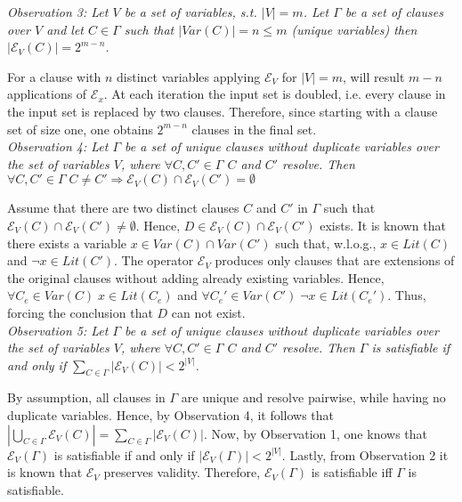 \documentclass[11pt,a4paper]{article}
\begin{document}
\begin{enumerate}
\begin{itemize}
\emph{Observation 3:  Let $V$ be a set of variables, s.t. $|V|=m$. Let $\Gamma$ be a set of clauses over $V$ and let $C \in \Gamma$ such that $|\mathit{Var}(C)|=n\leq m$ (unique variables) then $|\mathcal{E}_V(C)|=2^{m-n}$.}

For a clause with $n$ distinct variables applying $\mathcal{E}_V$ for $|V|=m$, will result $m-n$ applications of $\mathcal{E}_x$. At each iteration the input set is doubled, i.e. every clause in the input set is replaced by two clauses. Therefore, since starting with a clause set of size one, one obtains $2^{m-n}$ clauses in the final set.  \\



\emph{Observation 4: Let $\Gamma$ be a set of unique clauses without duplicate variables over the set of variables $V$, where $\forall C, C' \in \Gamma$ $C$ and $C'$ resolve. Then $\forall C, C' \in \Gamma \; C \neq C' \Rightarrow \mathcal{E}_V(C) \cap \mathcal{E}_V(C') = \emptyset$}


Assume that there are two distinct clauses $C$ and $C'$ in $\Gamma$ such that $ \mathcal{E}_V(C) \cap \mathcal{E}_V(C') \neq \emptyset$. Hence, $D \in  \mathcal{E}_V(C) \cap \mathcal{E}_V(C')$ exists. It is known that there exists a variable $x  \in \mathit{Var}(C) \cap  \mathit{Var}(C')$ such that, w.l.o.g., $x \in \mathit{Lit}(C)$ and $\neg x \in \mathit{Lit}(C')$. The operator $\mathcal{E}_V$ produces only clauses that are extensions of the original clauses without adding already existing variables. Hence, $\forall C_e \in \mathit{Var}(C) \; x  \in \mathit{Lit}(C_e)$ and $\forall C_e' \in \mathit{Var}(C') \; \neg x  \in \mathit{Lit}(C_e')$. Thus, forcing the conclusion that $D$ can not exist. \\


\emph{Observation 5: Let $\Gamma$ be a set of unique clauses without duplicate variables over the set of variables $V$, where $\forall C, C' \in \Gamma$ $C$ and $C'$ resolve. Then $\Gamma$ is satisfiable if and only if $\sum_{C \in \Gamma} | \mathcal{E}_V(C)|<2^{|V|}$.}

By assumption, all clauses in $\Gamma$ are unique and resolve pairwise, while having no duplicate variables. Hence, by Observation 4, it follows that $|\bigcup_{C \in \Gamma} \mathcal{E}_V(C)|= \sum_{C \in \Gamma} | \mathcal{E}_V(C)|$. Now, by Observation 1, one knows that $\mathcal{E}_V(\Gamma)$ is satisfiable if and only if $|\mathcal{E}_V(\Gamma)|< 2^{|V|}$. Lastly, from Observation 2 it is known that $\mathcal{E}_V$ preserves validity. Therefore, $\mathcal{E}_V(\Gamma)$ is satisfiable iff $\Gamma$ is satisfiable.  \\



\end{itemize}
\end{enumerate}
\end{document}
